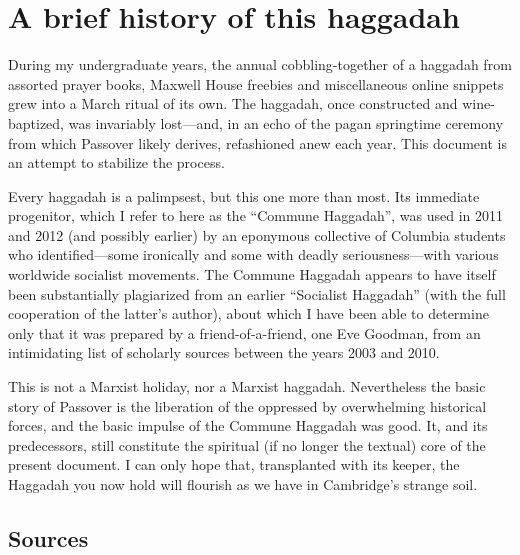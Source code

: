 \documentclass[a4paper,12pt,openany]{memoir}
\begin{document}
\chapter*{A brief history of this haggadah}

During my undergraduate years, the annual cobbling-together of a haggadah from
assorted prayer books, Maxwell House freebies and miscellaneous online snippets
grew into a March ritual of its own. The haggadah, once constructed and
wine-baptized, was invariably lost---and, in an echo of the pagan springtime
ceremony from which Passover likely derives, refashioned anew each year.  This
document is an attempt to stabilize the process.

Every haggadah is a palimpsest, but this one more than most. Its immediate
progenitor, which I refer to here as the ``Commune Haggadah'', was used in 2011
and 2012 (and possibly earlier) by an eponymous collective of Columbia students
who identified---some ironically and some with deadly seriousness---with various
worldwide socialist movements. The Commune Haggadah appears to have itself been
substantially plagiarized from an earlier ``Socialist Haggadah'' (with the full
cooperation of the latter's author), about which I have been able to determine
only that it was prepared by a friend-of-a-friend, one Eve Goodman, from an
intimidating list of scholarly sources between the years 2003 and 2010.

This is not a Marxist holiday, nor a Marxist haggadah. Nevertheless the basic
story of Passover is the liberation of the oppressed by overwhelming
historical forces, and the basic impulse of the Commune Haggadah was good. It,
and its predecessors, still constitute the spiritual (if no longer the textual)
core of the present document. I can only hope that, transplanted with its
keeper, the Haggadah you now hold will flourish as we have in Cambridge's
strange soil.

\section*{Sources}
\end{document}
